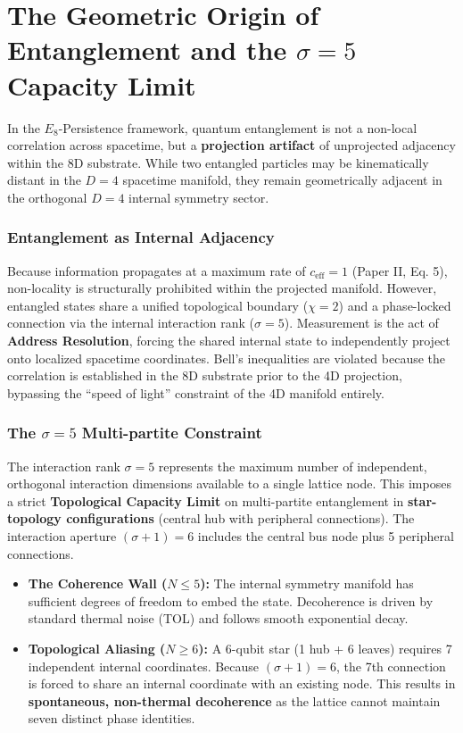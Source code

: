 \section{The Geometric Origin of Entanglement and the $\sigma=5$ Capacity Limit}

In the $E_8$-Persistence framework, quantum entanglement is not a non-local correlation across spacetime, but a \textbf{projection artifact} of unprojected adjacency within the 8D substrate. While two entangled particles may be kinematically distant in the $D=4$ spacetime manifold, they remain geometrically adjacent in the orthogonal $D=4$ internal symmetry sector.

\subsubsection{Entanglement as Internal Adjacency}

Because information propagates at a maximum rate of $c_{\text{eff}} = 1$ (Paper II, Eq. 5), non-locality is structurally prohibited within the projected manifold. However, entangled states share a unified topological boundary ($\chi=2$) and a phase-locked connection via the internal interaction rank ($\sigma=5$). Measurement is the act of \textbf{Address Resolution}, forcing the shared internal state to independently project onto localized spacetime coordinates. Bell's inequalities are violated because the correlation is established in the 8D substrate prior to the 4D projection, bypassing the ``speed of light'' constraint of the 4D manifold entirely.

\subsubsection{The $\sigma=5$ Multi-partite Constraint}

The interaction rank $\sigma=5$ represents the maximum number of independent, orthogonal interaction dimensions available to a single lattice node. This imposes a strict \textbf{Topological Capacity Limit} on multi-partite entanglement in \textbf{star-topology configurations} (central hub with peripheral connections). The interaction aperture $(\sigma+1)=6$ includes the central bus node plus 5 peripheral connections.

\begin{itemize}
    \item \textbf{The Coherence Wall ($N \leq 5$):} The internal symmetry manifold has sufficient degrees of freedom to embed the state. Decoherence is driven by standard thermal noise (TOL) and follows smooth exponential decay.
    \item \textbf{Topological Aliasing ($N \geq 6$):} A 6-qubit star (1 hub + 6 leaves) requires 7 independent internal coordinates. Because $(\sigma+1)=6$, the 7th connection is forced to share an internal coordinate with an existing node. This results in \textbf{spontaneous, non-thermal decoherence} as the lattice cannot maintain seven distinct phase identities.
\end{itemize}

